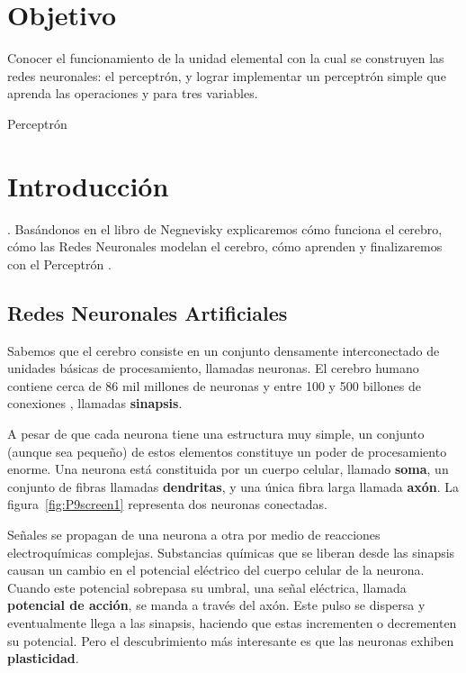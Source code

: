 


\section{Objetivo}

Conocer el funcionamiento de la unidad elemental con la cual se construyen las redes neuronales: el perceptrón, y lograr implementar un perceptrón simple que aprenda las operaciones  y  para tres variables.

\begin{auxcode}
 \caption{Perceptrón}
 \centering
\end{auxcode}

\section{Introducci\'on}

 \parencite[166]{Nengnevitsky2005}. Basándonos en el libro de Negnevisky explicaremos cómo funciona el cerebro, cómo las Redes Neuronales modelan el cerebro, cómo aprenden y finalizaremos con el Perceptrón \parencite[cap. 6]{Nengnevitsky2005}.


\subsection{Redes Neuronales Artificiales}

Sabemos que el cerebro consiste en un conjunto densamente interconectado de unidades básicas de procesamiento, llamadas neuronas. El cerebro humano contiene cerca de 86 mil millones de neuronas \parencite{Herculano-Houzel2009} y entre 100 y 500 billones de conexiones \parencite{Drachman2005}, llamadas \textbf{sinapsis}.\par

A pesar de que cada neurona tiene una estructura muy simple, un conjunto (aunque sea pequeño) de estos elementos constituye un poder de procesamiento enorme. Una neurona está constituida por un cuerpo celular, llamado \textbf{soma}, un conjunto de fibras llamadas \textbf{dendritas}, y una única fibra larga llamada \textbf{axón}. La figura~\ref{fig:P9screen1} representa dos neuronas conectadas.

Señales se propagan de una neurona a otra por medio de reacciones electroquímicas complejas. Substancias químicas que se liberan desde las sinapsis causan un cambio en el potencial eléctrico del cuerpo celular de la neurona. Cuando este potencial sobrepasa su umbral, una señal eléctrica, llamada \textbf{potencial de acción}, se manda a través del axón. Este pulso se dispersa y eventualmente llega a las sinapsis, haciendo que estas incrementen o decrementen su potencial. Pero el descubrimiento más interesante es que las neuronas exhiben \textbf{plasticidad}.\par

